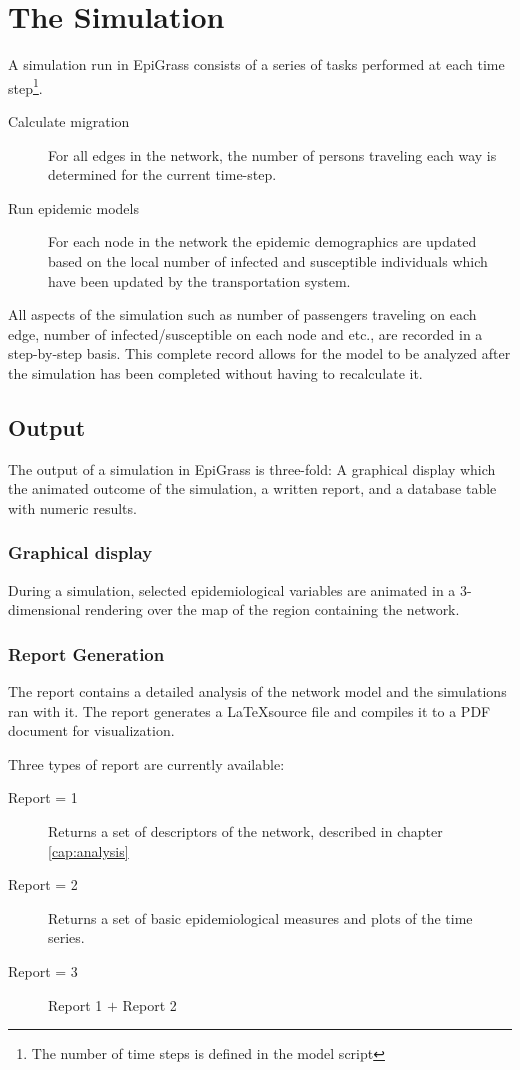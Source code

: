 \section{The Simulation}
A simulation run in EpiGrass consists of a series of tasks performed at each time step\footnote{The number of time steps is defined in the model script}.
\begin{description}
\item [Calculate migration] For all edges in the network, the number of persons traveling each way is determined for the current time-step.
\item [Run epidemic models] For each node in the network the epidemic demographics are updated based on the local number of infected and susceptible individuals which have been updated by the transportation system.
\end{description}

All aspects of the simulation such as number of passengers traveling on each edge, number of infected/susceptible on each node and etc., are recorded in a step-by-step basis. This complete record allows for the model to be analyzed after the simulation has been completed without having to recalculate it.


\subsection{Output}
The output of a simulation in EpiGrass is three-fold: A graphical display which the animated outcome of the simulation,  a written report, and a database table with numeric results. 

\subsubsection{Graphical display}
During a simulation, selected epidemiological variables are animated in a 3-dimensional rendering over the map of the region containing the network. 

\subsubsection{Report Generation}
The report contains a detailed analysis of the network model and the simulations ran with it. The report generates a \LaTeX source file and compiles it to a PDF document for visualization.

Three types of report are currently available:
\begin{description}
\item[Report = 1] Returns a set of descriptors of the network, described in chapter \ref{cap:analysis}
\item[Report = 2] Returns a set of basic epidemiological measures and plots of the time series.
\item[Report = 3] Report 1 $+$ Report 2
\end{description}

